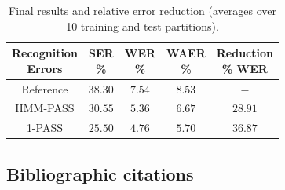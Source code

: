 \begin{table}[!b]
 \centering
  \caption{Final results and relative error reduction (averages over 10 training and test partitions).} \label{table-1}
 {\small
 \begin{tabular}{ccccc}
  \hline
  \hline
  \thead{Recognition \\ Errors} & \thead{SER \\ \%} & \thead{WER \\ \%} & \thead{WAER \\ \%} &
                        \thead{Reduction \\ \% WER} \\
  \hline
  \hline
  Reference & $38.30$ & $7.54$ & $8.53$ & $-$ \\
  \hline
  HMM-PASS & $30.55$ & $5.36$ & $6.67$ & $28.91$ \\
  1-PASS & $25.50$ & $4.76$ & $5.70$ & $36.87$   \\
  \hline
  \hline
 \end{tabular}}
\end{table}

\subsection{Bibliographic citations}

